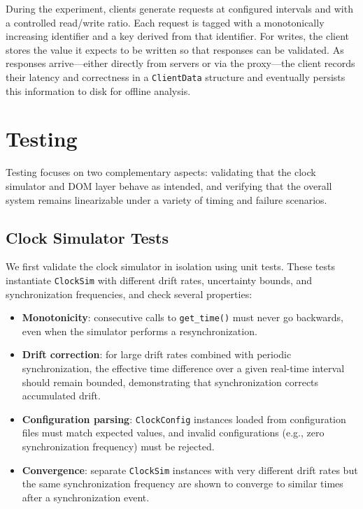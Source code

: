 \documentclass{article}
\begin{document}
During the experiment, clients generate requests at configured intervals and with a controlled read/write ratio. Each request is tagged with a monotonically increasing identifier and a key derived from that identifier. For writes, the client stores the value it expects to be written so that responses can be validated. As responses arrive---either directly from servers or via the proxy---the client records their latency and correctness in a \texttt{ClientData} structure and eventually persists this information to disk for offline analysis.

\section{Testing}
Testing focuses on two complementary aspects: validating that the clock simulator and DOM layer behave as intended, and verifying that the overall system remains linearizable under a variety of timing and failure scenarios.

\subsection{Clock Simulator Tests}
We first validate the clock simulator in isolation using unit tests. These tests instantiate \texttt{ClockSim} with different drift rates, uncertainty bounds, and synchronization frequencies, and check several properties:

\begin{itemize}
  \item \textbf{Monotonicity}: consecutive calls to \texttt{get\_time()} must never go backwards, even when the simulator performs a resynchronization.
  \item \textbf{Drift correction}: for large drift rates combined with periodic synchronization, the effective time difference over a given real-time interval should remain bounded, demonstrating that synchronization corrects accumulated drift.
  \item \textbf{Configuration parsing}: \texttt{ClockConfig} instances loaded from configuration files must match expected values, and invalid configurations (e.g., zero synchronization frequency) must be rejected.
  \item \textbf{Convergence}: separate \texttt{ClockSim} instances with very different drift rates but the same synchronization frequency are shown to converge to similar times after a synchronization event.
\end{itemize}
\end{document}

